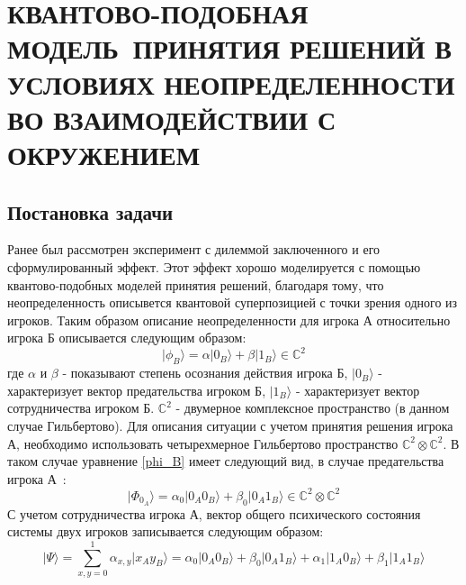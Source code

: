 \chapter{КВАНТОВО-ПОДОБНАЯ МОДЕЛЬ~ПРИНЯТИЯ РЕШЕНИЙ В УСЛОВИЯХ НЕОПРЕДЕЛЕННОСТИ ВО ВЗАИМОДЕЙСТВИИ С ОКРУЖЕНИЕМ}
\section{Постановка задачи}

Ранее был рассмотрен эксперимент с дилеммой заключенного и его сформулированный эффект.
Этот эффект хорошо моделируется с помощью квантово-подобных моделей принятия решений, благодаря
тому, что неопределенность описывется квантовой суперпозицией с точки зрения одного из игроков.
Таким образом описание неопределенности для игрока А относительно игрока Б описывается следующим образом:
\begin{equation}\label{phi_B}
    \vert \phi_{B} \rangle = \alpha \vert 0_{B} \rangle + \beta \vert 1_{B} \rangle \in \mathbb{C}^{2} %
\end{equation}
где $\alpha$ и $\beta$ - показывают степень осознания действия игрока Б, $\vert 0_{B} \rangle$ - характеризует
вектор предательства игроком Б, $\vert 1_{B} \rangle$ - характеризует вектор сотрудничества игроком Б.
$\mathbb{C}^{2}$ - двумерное комплексное пространство (в данном случае Гильбертово).
Для описания ситуации с учетом принятия решения игрока А, необходимо использовать четырехмерное Гильбертово
пространство $\mathbb{C}^{2} \otimes \mathbb{C}^{2}$.
В таком случае уравнение \eqref{phi_B} имеет следующий вид, в случае предательства игрока А~\citep{asano2011quantum}:
\begin{equation}
    \vert \Phi_{0_{A}} \rangle = \alpha_{0} \vert 0_{A} 0_{B} \rangle + \beta_{0} \vert 0_{A} 1_{B} \rangle \in \mathbb{C}^{2} \otimes \mathbb{C}^{2}
\end{equation}
С учетом сотрудничества игрока А, вектор общего психического состояния системы двух игроков записывается
следующим образом:
\begin{equation}
    \vert \Psi \rangle = \sum_{x,y=0}^{1} \alpha_{x,y} \vert x_{A} y_{B} \rangle =
    \alpha_{0} \vert 0_{A} 0_{B} \rangle + \beta_{0} \vert 0_{A} 1_{B} \rangle +
    \alpha_{1} \vert 1_{A} 0_{B} \rangle + \beta_{1} \vert 1_{A} 1_{B} \rangle
\end{equation}

